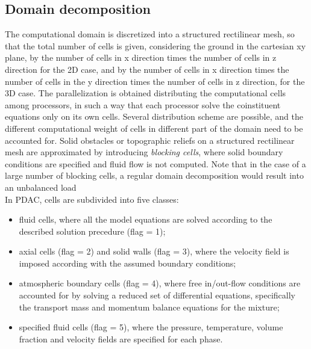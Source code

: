 \subsection{Domain decomposition}
The computational domain
is discretized into a structured rectilinear mesh, so that the total number
of cells is given, considering the ground in the cartesian xy plane,  
by the number of cells in x direction times the number of cells in z direction
for the 2D case, and by the number of cells in x direction times the number of cells 
in the y direction times the number of cells in z direction, for the 3D case.
The parallelization is obtained distributing the
computational cells among processors, in such a way that each processor solve
the coinstituent equations only on its own cells. 
Several distribution scheme are possible, and the different computational weight 
of cells in different part of the domain need to be accounted for.
Solid obstacles or topographic reliefs on a structured rectilinear mesh are 
approximated by introducing {\em blocking cells}, where solid boundary 
conditions are specified and fluid flow is not computed.
Note that in the case of a large number of blocking cells, 
a regular domain decomposition would result into an unbalanced load\\
In PDAC, cells are subdivided into five classes:
\begin{itemize}
\item fluid cells, where all the model equations are solved according to the described solution precedure (flag = 1);
\item axial cells (flag = 2) and solid walls (flag = 3), where the velocity 
field is imposed according with the assumed boundary conditions; 
\item atmospheric boundary cells (flag = 4), where free in/out-flow 
conditions are accounted for by solving a reduced set of differential 
equations, specifically the transport mass and momentum balance equations 
for the mixture;
\item specified fluid cells (flag = 5), where the pressure, temperature, 
volume fraction and velocity fields are specified for each phase.
\end{itemize}

